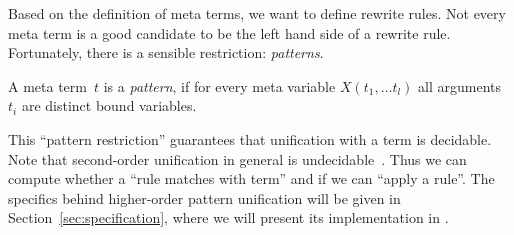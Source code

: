 Based on the definition of meta terms, we want to define rewrite
rules. Not every meta term is a good candidate to be the left hand
side of a rewrite rule. Fortunately, there is a sensible restriction:
\emph{patterns}.
%
\begin{definition}
  A meta term~$t$ is a \emph{pattern}, if for every meta variable
  $X(t_1, \ldots t_l)$ all arguments $t_i$ are distinct bound
  variables.
\end{definition}
%
This ``pattern restriction'' guarantees that unification with a term
is decidable. Note that second-order unification in general is undecidable~\cite{Goldfarb:81}.
Thus we can compute whether a ``rule matches with
term'' and if we can ``apply a rule''. The specifics behind
higher-order pattern unification will be given in
Section~\ref{sec:specification}, where we will present its implementation
in \Tosca.

